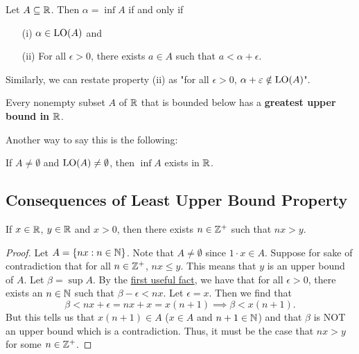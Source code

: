 \documentclass[a4paper]{report}
\begin{document}
\begin{lemma}
   Let \( A \subseteq \mathbb{R}  \). Then \( \alpha = \inf A  \) if and only if  
   \begin{enumerate}
       \item[(i)] \( \alpha \in \operatorname{LO}(A) \) and
        \item[(ii)] For all \( \epsilon > 0  \), there exists \( a \in A  \) such that \( a < \alpha + \epsilon \).
   \end{enumerate}
\end{lemma}

\begin{remark}
    Similarly, we can restate property (ii) as "for all \( \epsilon > 0  \), \( \alpha + \varepsilon \notin \operatorname{LO}(A) \)".
\end{remark}

\begin{theorem}
    Every nonempty subset \( A  \) of \( \mathbb{R}  \) that is bounded below has a \textbf{greatest upper bound in \( \mathbb{R}  \)}.
\end{theorem}

Another way to say this is the following:
\begin{center}
    If \( A \neq \emptyset  \) and \( \operatorname{LO}(A) \neq \emptyset  \), then \( \inf A  \) exists in \( \mathbb{R}  \).
\end{center}

\subsection{Consequences of Least Upper Bound Property}

\begin{theorem}\label{Archimedean Property}
    If \( x \in \mathbb{R}  \), \( y \in \mathbb{R}  \) and \( x > 0  \), then there exists \( n \in \mathbb{Z}^{+} \) such that \( nx > y  \).
\end{theorem}
\begin{proof}
Let \( A = \{ nx : n \in \mathbb{N}  \}  \). Note that \( A \neq \emptyset  \) since \( 1 \cdot x \in A  \). Suppose for sake of contradiction that for all \( n \in \mathbb{Z}^{+} \), \( nx \leq y  \). This means that \( y  \) is an upper bound of \( A  \). Let \( \beta = \sup A  \). By the {\hyperref[First Useful Fact]{first useful fact}}, we have that for all \( \epsilon > 0  \), there exists an \( n \in \mathbb{N}  \) such that \( \beta - \epsilon < nx  \). Let \( \epsilon = x  \). Then we find that  
\[  \beta < nx + \epsilon = nx + x = x(n+1) \implies \beta < x(n+1).  \]
But this tells us that \( x(n+1) \in A  \) (\( x \in A  \) and \( n+1 \in \mathbb{N}\)) and that \( \beta  \) is NOT an upper bound which is a contradiction. Thus, it must be the case that \( nx > y  \) for some \( n \in \mathbb{Z}^{+} \).
\end{proof}
\end{document}

